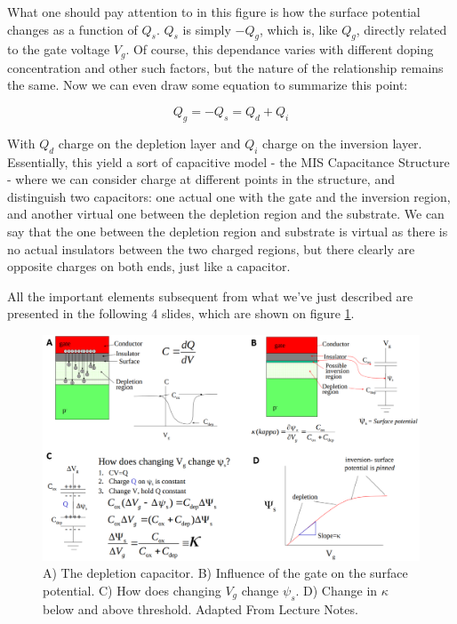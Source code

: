 What one should pay attention to in this figure is how the surface potential changes as a function of $Q_s$. $Q_s$ is simply $-Q_g$, which is, like $Q_g$, directly related to the gate voltage $V_g$. Of course, this dependance varies with different doping concentration and other such factors, but the nature of the relationship remains the same. Now we can even draw some equation to summarize this point: 

\begin{equation}
    Q_g = - Q_s = Q_d + Q_i
\end{equation}

With $Q_d$ charge on the depletion layer and $Q_i$ charge on the inversion layer. Essentially, this yield a sort of capacitive model - the MIS Capacitance Structure - where we can consider charge at different points in the structure, and distinguish two capacitors: one actual one with the gate and the inversion region, and another virtual one between the depletion region and the substrate. We can say that the one between the depletion region and substrate is virtual as there is no actual insulators between the two charged regions, but there clearly are opposite charges on both ends, just like a capacitor. 

All the important elements subsequent from what we've just described are presented in the following 4 slides, which are shown on figure \ref{fig:MIS_Capacitance_Slides}. 

\begin{figure}[H]
    \centering
    \includegraphics[width=1\linewidth]{../../Figures/MIS_Capacitance_Slides.PNG}
    \caption{A) The depletion capacitor. B) Influence of the gate on the surface potential. C) How does changing $V_g$ change $\psi_s$. D)  Change in $\kappa$ below and above threshold. Adapted From Lecture Notes.}
    \label{fig:MIS_Capacitance_Slides}
\end{figure}

